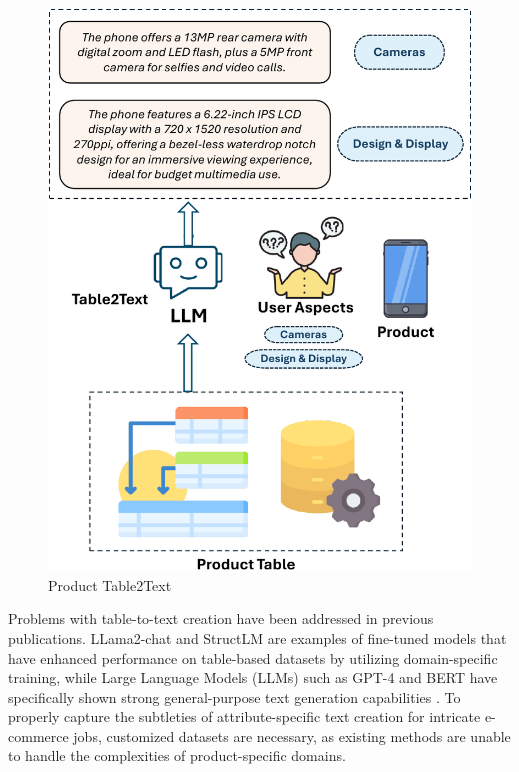 \begin{figure}[t]
    \centering
    \includegraphics[scale = 0.60]{images/task-def.pdf}
    \caption{Product Table2Text}
    \label{fig:task-def}
\end{figure}

Problems with table-to-text creation have been addressed in previous publications. LLama2-chat \cite{jiang2023mistral} and StructLM \cite{gao2024jsontuning} are examples of fine-tuned models that have enhanced performance on table-based datasets by utilizing domain-specific training, while Large Language Models (LLMs) such as GPT-4 and BERT have specifically shown strong general-purpose text generation capabilities \cite{touvron2023llama, zhuang2024structlm}. To properly capture the subtleties of attribute-specific text creation for intricate e-commerce jobs, customized datasets are necessary, as existing methods are unable to handle the complexities of product-specific domains.

